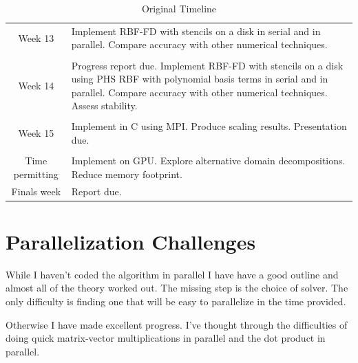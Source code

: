 \documentclass[12pt]{article}
\begin{document}
	\begin{table}
		\caption{Original Timeline}
		\begin{tabular}{ c| p{12cm}} 
			Week 13 & Implement RBF-FD with stencils on a disk in serial and in parallel. Compare accuracy with other numerical techniques.\\
			& \\
			Week 14 & Progress report due. Implement RBF-FD with stencils on a disk using PHS RBF with polynomial basis terms in serial and in parallel. Compare accuracy with other numerical techniques. Assess stability. \\
			&\\
			Week 15 & Implement in C using MPI. Produce scaling results. Presentation due.\\
			&\\
			Time permitting & Implement on GPU. Explore alternative domain decompositions. Reduce memory footprint.\\
			Finals week & Report due.
			
		\end{tabular}
		
	\end{table}
	
	
\section{Parallelization Challenges}
	While I haven't coded the algorithm in parallel I have have a good outline and almost all of the theory worked out. The missing step is the choice of solver. The only difficulty is finding one that will be easy to parallelize in the time provided. 
	
	Otherwise I have made excellent progress. I've thought through the difficulties of doing quick matrix-vector multiplications in parallel and the dot product in parallel. 
	
\end{document}
